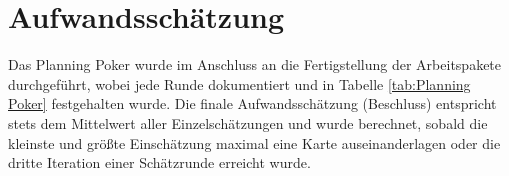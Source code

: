 \chapter{Aufwandsschätzung}
\label{chapter:3}
Das Planning Poker wurde im Anschluss an die Fertigstellung der Arbeitspakete durchgeführt, wobei jede Runde dokumentiert und in Tabelle \ref{tab:Planning Poker} festgehalten wurde. Die finale Aufwandsschätzung (Beschluss) entspricht stets dem Mittelwert aller Einzelschätzungen und wurde berechnet, sobald die kleinste und größte Einschätzung maximal eine Karte auseinanderlagen oder die dritte Iteration einer Schätzrunde erreicht wurde. 

